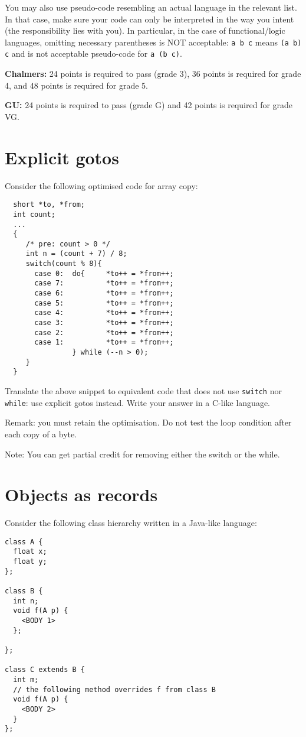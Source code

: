 \documentclass{article}
\begin{document}
You may also use pseudo-code resembling an actual language in the
relevant list. In that case, make sure your code can only be
interpreted in the way you intent (the responsibility lies with
you). In particular, in the case of functional/logic languages,
omitting necessary parentheses is NOT acceptable: \texttt{a b c} means
\texttt{(a b) c} and is not acceptable pseudo-code for \texttt{a (b
  c)}.


\textbf{Chalmers:}
24 points is required to pass (grade 3), 36 points is required for
grade 4, and 48 points is required for grade 5.

\textbf{GU:}
24 points is required to pass (grade G) and 42 points is
required for grade VG.

\section{Explicit gotos}

Consider the following optimised code for array copy:
\begin{verbatim}
  short *to, *from;
  int count;
  ...
  {
     /* pre: count > 0 */
     int n = (count + 7) / 8;
     switch(count % 8){
       case 0:	do{     *to++ = *from++;
       case 7:	        *to++ = *from++;
       case 6:	        *to++ = *from++;
       case 5:	        *to++ = *from++;
       case 4:	        *to++ = *from++;
       case 3:	        *to++ = *from++;
       case 2:	        *to++ = *from++;
       case 1:	        *to++ = *from++;
                } while (--n > 0);
     }
  }
\end{verbatim}

Translate the above snippet to equivalent code that does not use
\texttt{switch} nor \texttt{while}: use explicit gotos instead.
Write your answer in a C-like language.

Remark: you must retain the optimisation. Do not test the loop
condition after each copy of a byte.

Note: You can get partial credit for removing either the switch or the
while.

\section{Objects as records}

Consider the following class hierarchy written in a Java-like
language:
\begin{verbatim}
class A {
  float x;
  float y;
};

class B {
  int n;
  void f(A p) {
    <BODY 1>
  };

};

class C extends B {
  int m;
  // the following method overrides f from class B
  void f(A p) {
    <BODY 2>
  }
};
\end{verbatim}
\end{document}
